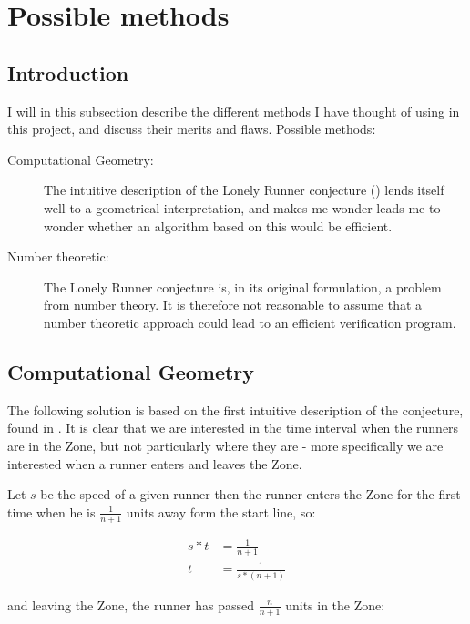 \section{Possible methods}
\label{choiceOfMethod}

\subsection{Introduction}
I will in this subsection describe the different methods I have thought of using in this project, and discuss their merits and flaws.
Possible methods:

\begin{description}
\item[Computational Geometry:] The intuitive description of the Lonely Runner conjecture () lends itself well to a geometrical interpretation, and makes me wonder  leads me to wonder whether an algorithm based on this would be efficient.

\item[Number theoretic:] The Lonely Runner conjecture is, in its original formulation, a problem from number theory. It is therefore not reasonable to assume that a number theoretic approach could lead to an efficient verification program.
\end{description}

\subsection{Computational Geometry}
\label{compGeo}

The following solution is based on the first intuitive description of the conjecture, found in . It is clear that we are interested in the time interval when the runners are in the Zone, but not particularly where they are - more specifically we are interested when a runner enters and leaves the Zone. 

Let $s$ be the speed of a given runner then the runner enters the Zone for the first time when he is $\frac{1}{n+1}$ units away form the start line, so: 

\begin{equation}
\label{eqa:speedOne}
\begin{split}
s * t &= \frac{1}{n+1} \\
t &= \frac{1}{s * (n+1)}
\end{split}
\end{equation}

and leaving the Zone, the runner has passed $\frac{n}{n+1}$ units in the Zone:

